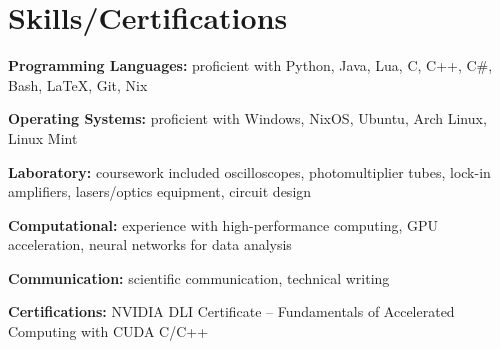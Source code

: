 \documentclass[letterpaper,11pt]{article}
\begin{document}
\section{Skills/Certifications}
 \begin{itemize}[leftmargin=0.15in, label={}, itemsep=2pt, parsep=0pt]
    \small{
     \item \textbf{Programming Languages: }{proficient with Python, Java, Lua, C, C++, C\#, Bash, LaTeX, Git, Nix}
     \item \textbf{Operating Systems: }{proficient with Windows, NixOS, Ubuntu, Arch Linux, Linux Mint}
     \item \textbf{Laboratory: }{coursework included oscilloscopes, photomultiplier tubes, lock-in amplifiers, lasers/optics equipment, circuit design}
     \item \textbf{Computational: }{experience with high-performance computing, GPU acceleration, neural networks for data analysis} %
     \item \textbf{Communication: }{scientific communication, technical writing}
     \item \textbf{Certifications: }{NVIDIA DLI Certificate -- Fundamentals of Accelerated Computing with CUDA C/C++}
    }
 \end{itemize}


\end{document}
